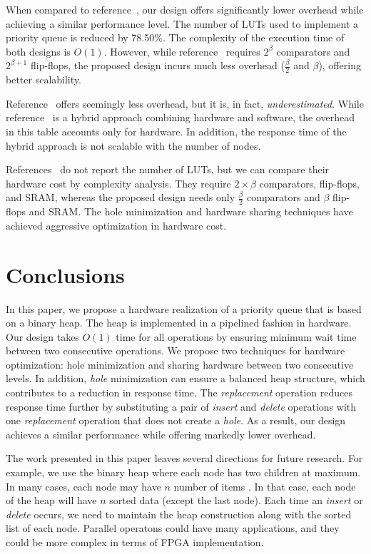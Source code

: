 \documentclass[10pt, conference, compsocconf]{IEEEtran}
\begin{document}
When compared to reference~\cite{hw8}, our design offers significantly lower overhead while achieving a similar performance level.
The number of LUTs used to implement a priority queue is reduced by 78.50\%.
The complexity of the execution time of both designs is $O(1)$.
However, while reference~\cite{hw8} requires $2^\beta$ comparators and $2^{\beta+1}$ flip-flops, the proposed design incurs much less overhead ($\frac{\beta}{2}$ and $\beta$), offering better scalability.

Reference~\cite{hw11} offers seemingly less overhead, but it is, in fact, {\it underestimated}.
While reference~\cite{hw11} is a hybrid approach combining hardware and software, the overhead in this table accounts only for hardware.
In addition, the response time of the hybrid approach is not scalable with the number of nodes.

References~\cite{fpga1,hw2} do not report the number of LUTs, but we can compare their hardware cost by complexity analysis.
They require $2 \times \beta$ comparators, flip-flops, and SRAM, whereas the proposed design needs only $\frac{\beta}{2}$ comparators and $\beta$ flip-flops and SRAM.
The hole minimization and hardware sharing techniques have achieved aggressive optimization in hardware cost.



\section{Conclusions}

In this paper, we propose a hardware realization of a priority queue that is based on a binary heap.
The heap is implemented in a pipelined fashion in hardware.
Our design takes $O(1)$ time for all operations by ensuring minimum wait time between two consecutive operations.
We propose two techniques for hardware optimization: hole minimization and sharing hardware between two consecutive levels.
In addition, {\it hole} minimization can ensure a balanced heap structure, which contributes to a reduction in response time.
The {\it replacement} operation reduces response time further by substituting a pair of {\it insert} and {\it delete} operations with one {\it replacement } operation that does not create a {\it hole}.
As a result, our design achieves a similar performance while offering markedly lower overhead.

The work presented in this paper leaves several directions for future research. For example, we use the binary heap where each node has two children at maximum. In many cases, each node may have $n$ number of items \cite{pq3}. In that case, each node of the heap will have $n$ sorted data (except the last node). Each time an {\it insert} or {\it delete} occurs, we need to maintain the heap construction along with the sorted list of each node. Parallel operatons could have many applications, and they could be more complex in terms of FPGA implementation.
\end{document}
